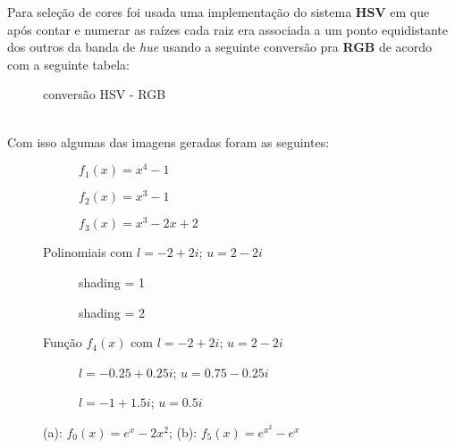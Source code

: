 \documentclass[12pt, a4paper]{article}
\begin{document}
    Para seleção de cores foi usada uma implementação do sistema \textbf{HSV} em
    que após contar e numerar as raízes cada raiz era associada a um ponto
    equidistante dos outros da banda de \emph{hue} usando a seguinte conversão
    pra \textbf{RGB} de acordo com a seguinte tabela:\\
    \begin{figure}[h]
        \centering
        \caption[]{conversão HSV - RGB}
    \end{figure}\\
    Com isso algumas das imagens geradas foram as seguintes:
    \begin{figure}[h]
        \begin{subfigure}{.3\textwidth}
            \caption{$f_{1}(x) = x^4 - 1$}
        \end{subfigure}
        \begin{subfigure}{.3\textwidth}
            \caption{$f_{2}(x) = x^3 - 1$}
        \end{subfigure}
        \begin{subfigure}{.3\textwidth}
            \caption{$f_{3}(x) = x^3 - 2x + 2$}
        \end{subfigure}
        \caption{Polinomiais com $l = -2 + 2i$; $u = 2 - 2i$}
    \end{figure}
    \begin{figure}[h]
        \begin{subfigure}{.5\textwidth}
            \caption{shading = 1}
        \end{subfigure}
        \begin{subfigure}{.5\textwidth}
            \caption{shading = 2}
        \end{subfigure}
        \caption{Função $f_4(x)$ com $l = -2 + 2i$; $u = 2 - 2i$}
    \end{figure}
    \begin{figure}[h]
        \begin{subfigure}{.5\textwidth}
            \caption{$l = -0.25 + 0.25i$; $u = 0.75 - 0.25i$}
        \end{subfigure}
        \begin{subfigure}{.5\textwidth}
            \caption{$l = -1 + 1.5i$; $u = 0.5i$}
        \end{subfigure}
        \caption{(a): $f_{0}(x) = e^{x} - 2x^2$; (b): $f_{5}(x) = e^{x^2} - e^{x}$}
    \end{figure}
\end{document}
